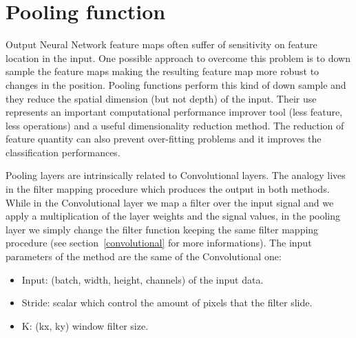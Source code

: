 \documentclass{standalone}
\begin{document}
\section[Pooling function]{Pooling function}\label{pooling}

Output Neural Network feature maps often suffer of sensitivity on feature location in the input.
One possible approach to overcome this problem is to down sample the feature maps making the resulting feature map more robust to changes in the position.
Pooling functions perform this kind of down sample and they reduce the spatial dimension (but not depth) of the input.
Their use represents an important computational performance improver tool (less feature, less operations) and a useful dimensionality reduction method.
The reduction of feature quantity can also prevent over-fitting problems and it improves the classification performances.

Pooling layers are intrinsically related to Convolutional layers.
The analogy lives in the filter mapping procedure which produces the output in both methods.
While in the Convolutional layer we map a filter over the input signal and we apply a multiplication of the layer weights and the signal values, in the pooling layer we simply change the filter function keeping the same filter mapping procedure (see section~\ref{convolutional} for more informations).
The input parameters of the method are the same of the Convolutional one:

\begin{itemize}

\item Input: (batch, width, height, channels) of the input data.

\item Stride: scalar which control the amount of pixels that the filter slide.

\item K: (kx, ky) window filter size.

\end{itemize}
\end{document}
